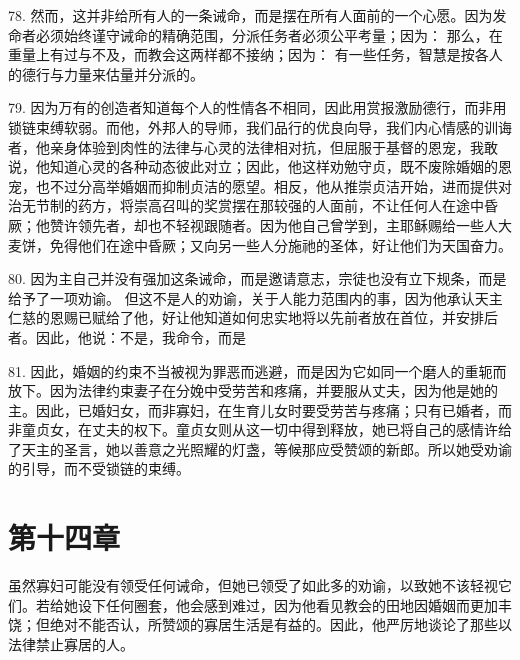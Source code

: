 78. 然而，这并非给所有人的一条诫命，而是摆在所有人面前的一个心愿。因为发命者必须始终谨守诫命的精确范围，分派任务者必须公平考量；因为：  那么，在重量上有过与不及，而教会这两样都不接纳；因为：  有一些任务，智慧是按各人的德行与力量来估量并分派的。 \par

79. 因为万有的创造者知道每个人的性情各不相同，因此用赏报激励德行，而非用锁链束缚软弱。而他，外邦人的导师，我们品行的优良向导，我们内心情感的训诲者，他亲身体验到肉性的法律与心灵的法律相对抗，但屈服于基督的恩宠，我敢说，他知道心灵的各种动态彼此对立；因此，他这样劝勉守贞，既不废除婚姻的恩宠，也不过分高举婚姻而抑制贞洁的愿望。相反，他从推崇贞洁开始，进而提供对治无节制的药方，将崇高召叫的奖赏摆在那较强的人面前，不让任何人在途中昏厥；他赞许领先者，却也不轻视跟随者。因为他自己曾学到，主耶稣赐给一些人大麦饼，免得他们在途中昏厥；又向另一些人分施祂的圣体，好让他们为天国奋力。\par

80. 因为主自己并没有强加这条诫命，而是邀请意志，宗徒也没有立下规条，而是给予了一项劝谕。  但这不是人的劝谕，关于人能力范围内的事，因为他承认天主仁慈的恩赐已赋给了他，好让他知道如何忠实地将以先前者放在首位，并安排后者。因此，他说：不是，我命令，而是 \par

81. 因此，婚姻的约束不当被视为罪恶而逃避，而是因为它如同一个磨人的重轭而放下。因为法律约束妻子在分娩中受劳苦和疼痛，并要服从丈夫，因为他是她的主。因此，已婚妇女，而非寡妇，在生育儿女时要受劳苦与疼痛；只有已婚者，而非童贞女，在丈夫的权下。童贞女则从这一切中得到释放，她已将自己的感情许给了天主的圣言，她以善意之光照耀的灯盏，等候那应受赞颂的新郎。所以她受劝谕的引导，而不受锁链的束缚。\par


\section{第十四章}

虽然寡妇可能没有领受任何诫命，但她已领受了如此多的劝谕，以致她不该轻视它们。若给她设下任何圈套，他会感到难过，因为他看见教会的田地因婚姻而更加丰饶；但绝对不能否认，所赞颂的寡居生活是有益的。因此，他严厉地谈论了那些以法律禁止寡居的人。\par

